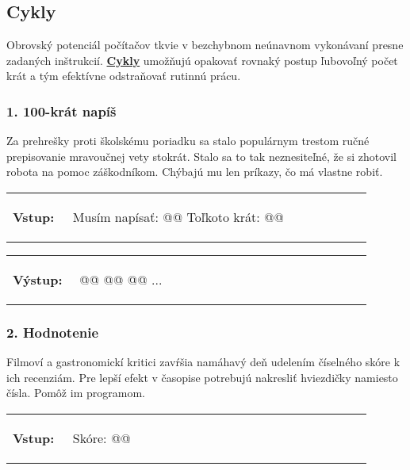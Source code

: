 \subsection{Cykly}
Obrovský potenciál počítačov tkvie v bezchybnom neúnavnom vykonávaní presne zadaných inštrukcií. \underline{\textbf{Cykly}} umožňujú opakovať rovnaký postup ľubovoľný počet krát a tým efektívne odstraňovať rutinnú prácu.


\subsubsection*{1. 100-krát napíš}
Za prehrešky proti školskému poriadku sa stalo populárnym trestom ručné prepisovanie mravoučnej vety stokrát. Stalo sa to tak neznesiteľné, že si zhotovil robota na pomoc záškodníkom. Chýbajú mu len príkazy, čo má vlastne robiť.

\begin{tabular}{@{}p{0.15\linewidth}p{0.75\linewidth}}
\textbf{\small Vstup:} &
\vspace{-3em}
\begin{code}
Musím napísať: @\fbox{\phantom{vstup}}@
Toľkoto krát: @\fbox{\phantom{vstup}}@
\end{code}
\end{tabular}

\vspace{-2em}
\begin{tabular}{@{}p{0.15\linewidth}p{0.75\linewidth}}
\textbf{\small Výstup:} &
\vspace{-3em}
\begin{code}
@\fbox{\phantom{vstup}}@
@\fbox{\phantom{vstup}}@
@\fbox{\phantom{vstup}}@
...
\end{code}
\end{tabular}
\vspace{-2em}


\subsubsection*{2. Hodnotenie}
Filmoví a gastronomickí kritici zavŕšia namáhavý deň udelením číselného skóre k ich recenziám. Pre lepší efekt v časopise potrebujú nakresliť hviezdičky namiesto čísla. Pomôž im programom.

\begin{tabular}{@{}p{0.15\linewidth}p{0.75\linewidth}}
\textbf{\small Vstup:} &
\vspace{-3em}
\begin{code}
Skóre: @\fbox{5}@
\end{code}
\end{tabular}

